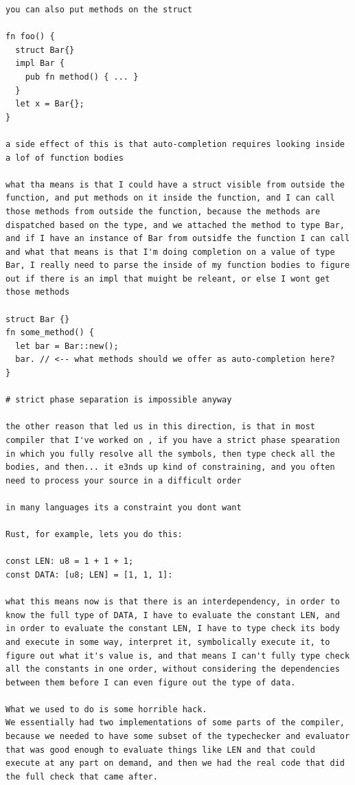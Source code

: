 \documentclass[12pt, a4paper]{report}
\begin{document}
\begin{verbatim}
you can also put methods on the struct

fn foo() {
  struct Bar{}
  impl Bar {
    pub fn method() { ... }
  }
  let x = Bar{};
}

a side effect of this is that auto-completion requires looking inside
a lof of function bodies

what tha means is that I could have a struct visible from outside the
function, and put methods on it inside the function, and I can call
those methods from outside the function, because the methods are
dispatched based on the type, and we attached the method to type Bar,
and if I have an instance of Bar from outsidfe the function I can call
and what that means is that I'm doing completion on a value of type
Bar, I really need to parse the inside of my function bodies to figure
out if there is an impl that muight be releant, or else I wont get
those methods

struct Bar {}
fn some_method() {
  let bar = Bar::new();
  bar. // <-- what methods should we offer as auto-completion here?
}

# strict phase separation is impossible anyway

the other reason that led us in this direction, is that in most
compiler that I've worked on , if you have a strict phase spearation
in which you fully resolve all the symbols, then type check all the
bodies, and then... it e3nds up kind of constraining, and you often
need to process your source in a difficult order

in many languages its a constraint you dont want

Rust, for example, lets you do this:

const LEN: u8 = 1 + 1 + 1;
const DATA: [u8; LEN] = [1, 1, 1]:

what this means now is that there is an interdependency, in order to
know the full type of DATA, I have to evaluate the constant LEN, and
in order to evaluate the constant LEN, I have to type check its body
and execute in some way, interpret it, symbolically execute it, to
figure out what it's value is, and that means I can't fully type check
all the constants in one order, without considering the dependencies
between them before I can even figure out the type of data.

What we used to do is some horrible hack.
We essentially had two implementations of some parts of the compiler,
because we needed to have some subset of the typechecker and evaluator
that was good enough to evaluate things like LEN and that could
execute at any part on demand, and then we had the real code that did
the full check that came after.


\end{verbatim}
\end{document}
